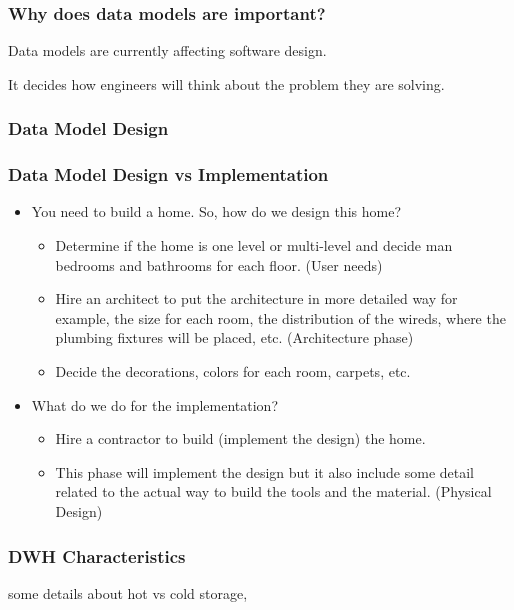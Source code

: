 \begin{frame}
\frametitle{Why does data models are important?}
	\begin{wideitemize}	
		\item Data models are currently affecting software design. 
		\item It decides how engineers will think about the problem they are solving.
	\end{wideitemize}
\end{frame}
\subsubsection{Data Model Design}
\begin{frame}
\frametitle{Data Model Design vs Implementation}
	\begin{itemize}[<+->]
	\item You need to build a home. So, how do we design this home?
		\begin{itemize}[<+->]
			\item Determine if the home is one level or multi-level and decide man bedrooms and bathrooms for each floor. (User needs)
			\item Hire an architect to put the architecture in more detailed way for example, the size for each room, the distribution of the wireds, where the plumbing fixtures will be placed, etc. (Architecture phase)
			\item Decide the decorations, colors for each room, carpets, etc. 
		\end{itemize}
	\item What do we do for the implementation?
		\begin{itemize}[<+->]
			\item Hire a contractor to build (implement the design) the home. 
			\item This phase will implement the design but it also include some detail related to the actual way to build the tools and the material. (Physical Design)
		\end{itemize}		
	\end{itemize}
\end{frame}

\begin{frame}
\frametitle{DWH Characteristics}


some details about hot vs cold storage,

\end{frame}

